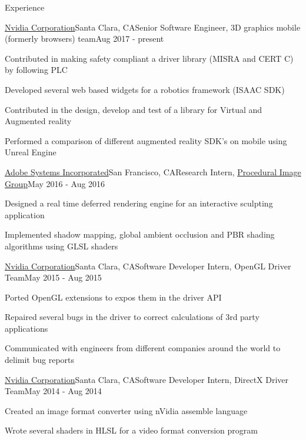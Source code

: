 \documentclass{resume} %
\begin{document}

\begin{rSection}{Experience}

\begin{rSubsection}{\href{http://www.nvidia.com}{Nvidia Corporation}}{Santa Clara, CA}{Senior Software Engineer, 3D graphics mobile (formerly browsers) team}{Aug 2017 - present}
\item Contributed in making safety compliant a driver library (MISRA and CERT C) by following PLC
\item Developed several web based widgets for a robotics framework (ISAAC SDK)
\item Contributed in the design, develop and test of a library for Virtual and Augmented reality
\item Performed a comparison of different augmented reality SDK's on mobile using Unreal Engine
\end{rSubsection}

\begin{rSubsection}{\href{http://www.adobe.com/}{Adobe Systems Incorporated}}{San Francisco, CA}{Research Intern, \href{http://research.adobe.com/}{Procedural Image Group}}{May 2016 - Aug 2016}
\item Designed a real time deferred rendering engine for an interactive sculpting application
\item Implemented shadow mapping, global ambient occlusion and PBR shading algorithms using GLSL shaders
\end{rSubsection}

\begin{rSubsection}{\href{http://www.nvidia.com}{Nvidia Corporation}}{Santa Clara, CA}{Software Developer Intern, OpenGL Driver Team}{May 2015 - Aug 2015}
\item Ported OpenGL extensions to expos them in the driver API
\item Repaired several bugs in the driver to correct calculations of 3rd party applications
\item Communicated with engineers from different companies around the world to delimit bug reports
\end{rSubsection}

\begin{rSubsection}{\href{http://www.nvidia.com}{Nvidia Corporation}}{Santa Clara, CA}{Software Developer Intern, DirectX Driver Team}{May 2014 - Aug 2014}
\item Created an image format converter using nVidia assemble language
\item Wrote several shaders in HLSL for a video format conversion program
\end{rSubsection}


\end{rSection}
\end{document}
